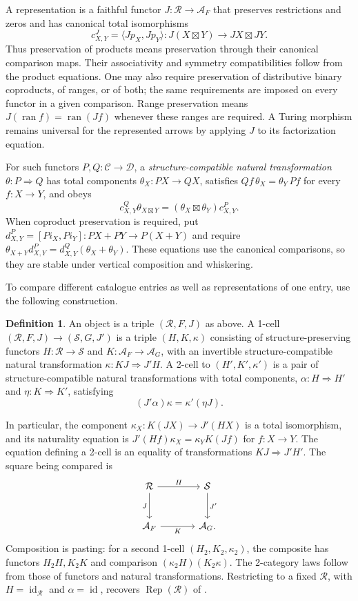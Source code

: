 \documentclass[11pt]{article}
\theoremstyle{definition}
\newtheorem{definition}[theorem]{Definition}
\newcommand{\R}{\mathcal R}
\newcommand{\C}{\mathcal C}
\newcommand{\id}{\operatorname{id}}
\newcommand{\Rep}{\operatorname{Rep}}
\begin{document}
A representation is a faithful functor $J:\R\to\mathcal A_F$
that preserves restrictions and zeros and has canonical total
isomorphisms
\[
 c^J_{X,Y}=\langle Jp_X,Jp_Y\rangle:
 J(X\boxtimes Y)\longrightarrow JX\boxtimes JY.
\]
Thus preservation of products means preservation through their
canonical comparison maps. Their associativity and symmetry
compatibilities follow from the product equations. One may also
require preservation of distributive binary coproducts, of ranges,
or of both; the same requirements are imposed on every functor
in a given comparison. Range preservation means
$J(\operatorname{ran}f)=\operatorname{ran}(Jf)$ whenever these
ranges are required. A Turing morphism remains universal for the
represented arrows by applying $J$ to its factorization equation.

For such functors $P,Q:\C\to\mathcal D$, a
\emph{structure-compatible natural transformation}
$\theta:P\Rightarrow Q$ has total components
$\theta_X:PX\to QX$, satisfies
$Qf\,\theta_X=\theta_Y\,Pf$ for every $f:X\to Y$, and obeys
\begin{equation}\label{eq:product-compatibility}
 c^Q_{X,Y}\theta_{X\boxtimes Y}
       =(\theta_X\boxtimes\theta_Y)c^P_{X,Y}.
\end{equation}
When coproduct preservation is required, put
$d^P_{X,Y}=[Pi_X,Pi_Y]:PX+PY\to P(X+Y)$ and require
$\theta_{X+Y}d^P_{X,Y}=d^Q_{X,Y}(\theta_X+\theta_Y)$.
These equations use the canonical comparisons, so they are stable
under vertical composition and whiskering.

To compare different catalogue entries as well as representations of
one entry, use the following construction.
\begin{definition}\label{def:global}
An object is a triple $(\R,F,J)$ as above. A 1-cell
$(\R,F,J)\to(\mathcal S,G,J')$ is a triple $(H,K,\kappa)$ consisting
of structure-preserving functors $H:\R\to\mathcal S$ and
$K:\mathcal A_F\to\mathcal A_G$, with an invertible
structure-compatible natural transformation
$\kappa:KJ\Rightarrow J'H$. A 2-cell to $(H',K',\kappa')$ is a pair
of structure-compatible natural transformations with total components,
$\alpha:H\Rightarrow H'$ and $\eta:K\Rightarrow K'$, satisfying
\[
 (J'\alpha)\kappa=\kappa'(\eta J).
\]
\end{definition}
In particular, the component
$\kappa_X:K(JX)\to J'(HX)$ is a total isomorphism, and its
naturality equation is
$J'(Hf)\kappa_X=\kappa_YK(Jf)$ for $f:X\to Y$.
The equation defining a 2-cell is an equality of transformations
$KJ\Rightarrow J'H'$. The square being compared is
\[
\begin{tikzcd}[column sep=large,row sep=large]
\R\arrow[r,"H"]\arrow[d,"J"'] & \mathcal S\arrow[d,"J'"]\\
\mathcal A_F\arrow[r,"K"'] & \mathcal A_G.
\end{tikzcd}
\]
Composition is pasting: for a second 1-cell $(H_2,K_2,\kappa_2)$,
the composite has functors $H_2H,K_2K$ and comparison
$(\kappa_2H)(K_2\kappa)$. The 2-category laws follow from those
of functors and natural transformations. Restricting to a fixed
$\R$, with $H=\id_{\R}$ and $\alpha=\id$, recovers
$\Rep(\R)$ of \cite{Comparisons}.
\end{document}
